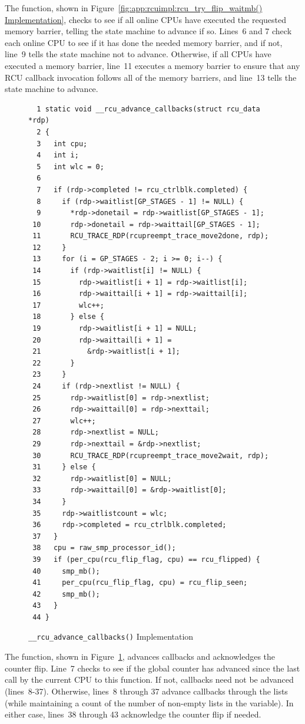The  function, shown in
Figure~\ref{fig:app:rcuimpl:rcu_try_flip_waitmb() Implementation},
checks to see
if all online CPUs have executed the requested memory barrier,
telling the state machine to advance if so.
Lines~6 and 7 check each online CPU to see if it has
done the needed memory barrier, and if not, line~9 tells
the state machine not to advance.
Otherwise, if all CPUs have executed a memory barrier, line~11
executes a memory barrier to ensure that any RCU callback invocation
follows all of the memory barriers, and line~13 tells the
state machine to advance.

\begin{figure}[tbp]
{ \scriptsize
\begin{verbatim}
  1 static void __rcu_advance_callbacks(struct rcu_data *rdp)
  2 {
  3   int cpu;
  4   int i;
  5   int wlc = 0;
  6
  7   if (rdp->completed != rcu_ctrlblk.completed) {
  8     if (rdp->waitlist[GP_STAGES - 1] != NULL) {
  9       *rdp->donetail = rdp->waitlist[GP_STAGES - 1];
 10       rdp->donetail = rdp->waittail[GP_STAGES - 1];
 11       RCU_TRACE_RDP(rcupreempt_trace_move2done, rdp);
 12     }
 13     for (i = GP_STAGES - 2; i >= 0; i--) {
 14       if (rdp->waitlist[i] != NULL) {
 15         rdp->waitlist[i + 1] = rdp->waitlist[i];
 16         rdp->waittail[i + 1] = rdp->waittail[i];
 17         wlc++;
 18       } else {
 19         rdp->waitlist[i + 1] = NULL;
 20         rdp->waittail[i + 1] =
 21           &rdp->waitlist[i + 1];
 22       }
 23     }
 24     if (rdp->nextlist != NULL) {
 25       rdp->waitlist[0] = rdp->nextlist;
 26       rdp->waittail[0] = rdp->nexttail;
 27       wlc++;
 28       rdp->nextlist = NULL;
 29       rdp->nexttail = &rdp->nextlist;
 30       RCU_TRACE_RDP(rcupreempt_trace_move2wait, rdp);
 31     } else {
 32       rdp->waitlist[0] = NULL;
 33       rdp->waittail[0] = &rdp->waitlist[0];
 34     }
 35     rdp->waitlistcount = wlc;
 36     rdp->completed = rcu_ctrlblk.completed;
 37   }
 38   cpu = raw_smp_processor_id();
 39   if (per_cpu(rcu_flip_flag, cpu) == rcu_flipped) {
 40     smp_mb();
 41     per_cpu(rcu_flip_flag, cpu) = rcu_flip_seen;
 42     smp_mb();
 43   }
 44 }
\end{verbatim}
}
\caption{{\tt \_\_rcu\_advance\_callbacks()} Implementation}
\label{fig:app:rcuimpl:__rcu_advance_callbacks() Implementation}
\end{figure}

The  function, shown in
Figure~\ref{fig:app:rcuimpl:__rcu_advance_callbacks() Implementation},
advances callbacks and acknowledges the counter flip.
Line~7 checks to see if the global 
counter has advanced since the last call by the current CPU to this
function.
If not, callbacks need not be advanced (lines~8-37).
Otherwise, lines~8 through 37 advance callbacks through the lists
(while maintaining a count of the number of non-empty lists in the
 variable).
In either case, lines~38 through 43 acknowledge the counter flip
if needed.

